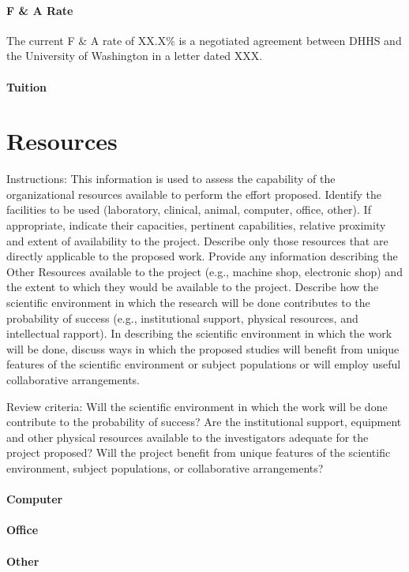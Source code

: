 \documentclass[12pt]{article}
\newcommand{\instructions}[1]{}
\renewcommand{\instructions}[1]{{\scriptsize \sc #1}}
\begin{document}
\paragraph{F \& A Rate}
The current F \& A rate of XX.X\% is a negotiated agreement between DHHS and the University of Washington in a letter dated XXX.

\paragraph{Tuition}

\clearpage
\section*{Resources}

\instructions{ Instructions: This information is used to assess the
    capability of the organizational resources available to perform
    the effort proposed.  Identify the facilities to be used
    (laboratory, clinical, animal, computer, office, other). If
    appropriate, indicate their capacities, pertinent capabilities,
    relative proximity and extent of availability to the
    project. Describe only those resources that are directly
    applicable to the proposed work. Provide any information
    describing the Other Resources available to the project (e.g.,
    machine shop, electronic shop) and the extent to which they would
    be available to the project.  Describe how the scientific
    environment in which the research will be done contributes to the
    probability of success (e.g., institutional support, physical
    resources, and intellectual rapport). In describing the scientific
    environment in which the work will be done, discuss ways in which
    the proposed studies will benefit from unique features of the
    scientific environment or subject populations or will employ
    useful collaborative arrangements.}

\instructions{ Review criteria: Will the scientific environment in
    which the work will be done contribute to the probability of
    success? Are the institutional support, equipment and other
    physical resources available to the investigators adequate for the
    project proposed? Will the project benefit from unique features of
    the scientific environment, subject populations, or collaborative
    arrangements?}

\paragraph{Computer}

\paragraph{Office}

\paragraph{Other}
\end{document}

